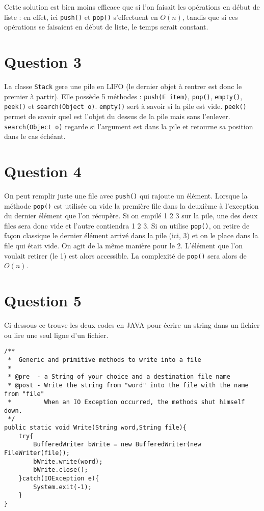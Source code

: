 \documentclass[a4paper,10pt]{article}
\begin{document}
Cette solution est bien moins efficace que si l'on faisait les opérations en début de liste : en effet, ici \texttt{push()} et \texttt{pop()} s'effectuent en $O(n)$, tandis que si ces opérations se faisaient en début de liste, le temps serait constant.

\section*{Question 3}

La classe \texttt{Stack} gere une pile en LIFO (le dernier objet à rentrer est donc le premier à partir). Elle possède 5 méthodes : \texttt{push(E item)}, \texttt{pop()}, \texttt{empty()}, \texttt{peek()} et \texttt{search(Object o)}. \texttt{empty()} sert à savoir si la pile est vide. \texttt{peek()} permet de savoir quel est l'objet du dessus de la pile mais sans l'enlever. \texttt{search(Object o)} regarde si l'argument est dans la pile et retourne sa position dans le cas échéant.

\section*{Question 4}

On peut remplir juste une file avec \texttt{push()} qui rajoute un élément. Lorsque la méthode \texttt{pop()} est utilisée on vide la première file dans la deuxième à l'exception du dernier élément que l'on récupère. Si on empilé 1 2 3 sur la pile, une des deux files sera donc vide et l'autre contiendra 1 2 3. Si on utilise \texttt{pop()}, on retire de façon classique le dernier élément arrivé dans la pile (ici, 3) et on le place dans la file qui était vide. On agit de la même manière pour le 2. L'élément que l'on voulait retirer (le 1) est alors accessible. La complexité de \texttt{pop()} sera alors de $O(n)$.

\section*{Question 5}

Ci-dessous ce trouve les deux codes en JAVA pour écrire un string dans un fichier ou lire une seul ligne d'un fichier.

\begin{lstlisting}
/**
 *  Generic and primitive methods to write into a file
 * 
 * @pre  - a String of your choice and a destination file name
 * @post - Write the string from "word" into the file with the name from "file"
 *         When an IO Exception occurred, the methods shut himself down.
 */
public static void Write(String word,String file){
    try{
        BufferedWriter bWrite = new BufferedWriter(new FileWriter(file));
        bWrite.write(word);
        bWrite.close();
    }catch(IOException e){
        System.exit(-1);
    }
}
\end{lstlisting}
\end{document}
